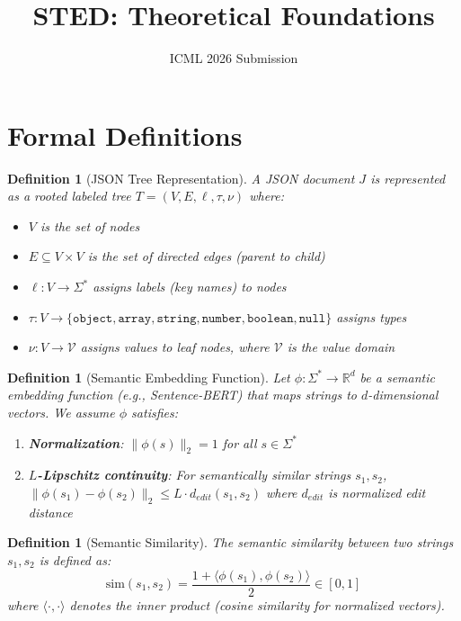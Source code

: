 \documentclass{article}
\title{STED: Theoretical Foundations}
\author{ICML 2026 Submission}
\date{}
\newtheorem{definition}[theorem]{Definition}
\begin{document}
\maketitle

\section{Formal Definitions}

\begin{definition}[JSON Tree Representation]
\label{def:json-tree}
A JSON document $J$ is represented as a rooted labeled tree $T = (V, E, \ell, \tau, \nu)$ where:
\begin{itemize}
    \item $V$ is the set of nodes
    \item $E \subseteq V \times V$ is the set of directed edges (parent to child)
    \item $\ell: V \to \Sigma^*$ assigns labels (key names) to nodes
    \item $\tau: V \to \{\texttt{object}, \texttt{array}, \texttt{string}, \texttt{number}, \texttt{boolean}, \texttt{null}\}$ assigns types
    \item $\nu: V \to \mathcal{V}$ assigns values to leaf nodes, where $\mathcal{V}$ is the value domain
\end{itemize}
\end{definition}

\begin{definition}[Semantic Embedding Function]
\label{def:embedding}
Let $\phi: \Sigma^* \to \mathbb{R}^d$ be a semantic embedding function (e.g., Sentence-BERT) that maps strings to $d$-dimensional vectors. We assume $\phi$ satisfies:
\begin{enumerate}
    \item \textbf{Normalization}: $\|\phi(s)\|_2 = 1$ for all $s \in \Sigma^*$
    \item \textbf{$L$-Lipschitz continuity}: For semantically similar strings $s_1, s_2$, $\|\phi(s_1) - \phi(s_2)\|_2 \leq L \cdot d_{edit}(s_1, s_2)$ where $d_{edit}$ is normalized edit distance
\end{enumerate}
\end{definition}

\begin{definition}[Semantic Similarity]
\label{def:semantic-sim}
The semantic similarity between two strings $s_1, s_2$ is defined as:
\begin{equation}
    \text{sim}(s_1, s_2) = \frac{1 + \langle \phi(s_1), \phi(s_2) \rangle}{2} \in [0, 1]
\end{equation}
where $\langle \cdot, \cdot \rangle$ denotes the inner product (cosine similarity for normalized vectors).
\end{definition}
\end{document}
